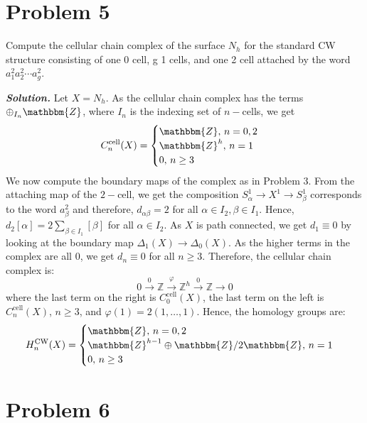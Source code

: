 \documentclass[11pt]{article}
\newcommand{\bb}[1]{\mathbb{#1}}
\newcommand{\Z}{\bb{Z}}
\newcommand{\sol}{ \textbf{\textit{Solution.}} }
\begin{document}
 \section{Problem 5}

 \begin{prob}{}{}
    Compute the cellular chain complex of the surface $N_{h}$ for the standard CW structure consisting of one 0 cell, g 1 cells, and one 2 cell attached by the word $a_{1}^{2} a_{2}^{2} \cdots a_{g}^{2}$.
 \end{prob}

 \sol Let \( X = N_h \). As the cellular chain complex has the terms \( \oplus_{I_n}\mathbbm{Z} \), where \( I_n \) is the indexing set of \( n- \)cells, we get
 \[
   C_n^{\textrm{cell}}(X) =
   \begin{cases}
     \mathbbm{Z}, \, n = 0,2   \\
     \mathbbm{Z}^{h}, \, n = 1 \\
     0, \, n \geq 3
   \end{cases}
 \]
 We now compute the boundary maps of the complex as in Problem 3. From the attaching map of the \( 2- \)cell, we get the composition \( S^{1}_\alpha \to X^{1} \to S^{1}_\beta \) corresponds to the word \( a_{\beta}^2 \) and therefore, \( d_{\alpha\beta} = 2 \) for all \( \alpha \in I_{2}, \beta \in I_1 \). Hence, \( d_2[\alpha] = 2 \sum_{\beta \in I_1}[\beta]  \) for all \( \alpha \in I_2 \). As \( X \) is path connected, we get \( d_1 \equiv 0 \) by looking at the boundary map \( \Delta_1(X) \to \Delta_0(X) \). As the higher terms in the complex are all 0, we get \( d_n \equiv 0 \) for all \( n \geq 3 \). Therefore, the cellular chain complex is:
 \[0\xrightarrow{0}\Z \xrightarrow{\varphi}\Z^{h}\xrightarrow{0}\Z\to 0\]
 where the last term on the right is \( C_0^{\textrm{cell}}(X) \), the last term on the left is \( C_n^{\textrm{cell}}(X) \), \( n \geq 3 \), and \( \varphi(1) = 2(1,\dots,1) \). Hence, the homology groups are:
 \[
   H_n^{\textrm{CW}} (X) =
   \begin{cases}
     \mathbbm{Z}, \, n = 0,2                                      \\
     \mathbbm{Z}^{h-1} \oplus \mathbbm{Z}/2 \mathbbm{Z}, \, n = 1 \\
     0, \, n \geq 3
   \end{cases}
 \]

 \section{Problem 6}
\end{document}
